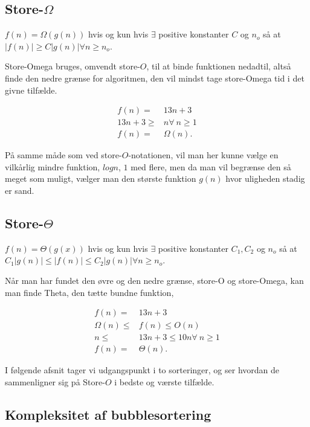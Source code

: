 \subsection{Store-$\Omega$}
\begin{defn}
$f(n) = \Omega(g(n))$ hvis og kun hvis $\exists$ positive konstanter $C$ og $n_o$ så at $|f(n)| \geq C |g(n)| \forall n \geq n_o$.
\end{defn}
Store-Omega bruges, omvendt store-$O$, til at binde funktionen nedadtil, altså finde den nedre grænse for algoritmen, den vil mindst tage store-Omega tid i det givne tilfælde.
\begin{exmp}
\begin{align*}
f(n)=& 13n+3 \\
13n+3 \geq& n \forall \ n \geq 1 \\
f(n) =& \Omega(n).
\end{align*}
\end{exmp}

På samme måde som ved store-$O$-notationen, vil man her kunne vælge en vilkårlig mindre funktion, $logn$, $1$ med flere, men da man vil begrænse den så meget som muligt, vælger man den største funktion $g(n)$ hvor uligheden stadig er sand.
\subsection{Store-$\Theta$}
\begin{defn}
$f(n) = \Theta(g(x))$ hvis og kun hvis $\exists$ positive konstanter $C_1, C_2$ og $n_o$ så at $C_1|g(n)| \leq |f(n)| \leq C_2|g(n)| \forall n \geq n_o$.
\end{defn}
Når man har fundet den øvre og den nedre grænse, store-O og store-Omega, kan man finde Theta, den tætte bundne funktion,
\begin{exmp}
\begin{align*}
f(n)=& 13n+3 \\
\Omega(n) \leq& f(n) \leq O(n) \\
n \leq& 13n+3 \leq 10n \forall \ n \geq 1 \\
f(n) =& \Theta(n).
\end{align*}
\end{exmp}

I følgende afsnit tager vi udgangspunkt i to sorteringer, og ser hvordan de sammenligner sig på Store-$O$ i bedste og værste tilfælde.

\subsection{Kompleksitet af bubblesortering} \label{kap:kom_bubble}

